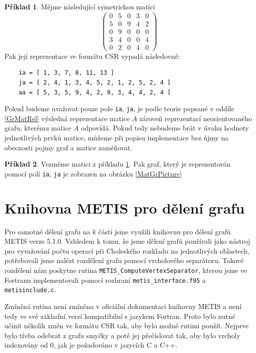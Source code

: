 \documentclass[11pt,american,czech,oneside]{book}
\theoremstyle{plain}
\theoremstyle{definition}
\newtheorem{example}{Příklad}
\begin{document}
\begin{example}
  \label{CSRexample}
  Mějme následující symetrickou matici
  \[
    \begin{pmatrix}
      0 & 5 & 0 & 3 & 0 \\
      5 & 0 & 9 & 4 & 2 \\
      0 & 9 & 0 & 0 & 0 \\
      3 & 4 & 0 & 0 & 4 \\
      0 & 2 & 0 & 4 & 0
    \end{pmatrix}
  \]
  Pak její reprezentace ve formátu CSR vypadá následovně:
  \begin{verbatim}
    ia = [ 1, 3, 7, 8, 11, 13 ]
    ja = [ 2, 4, 1, 3, 4, 5, 2, 1, 2, 5, 2, 4 ]
    aa = [ 5, 3, 5, 9, 4, 2, 9, 3, 4, 4, 2, 4 ]
  \end{verbatim}
\end{example}

Pokud budeme uvažovat pouze pole \texttt{ia}, \texttt{ja}, je podle teorie popsané v oddíle \ref{GrMatRel} výsledná reprezentace matice $A$ zároveň reprezentací neorientovaného grafu, kterému matice $A$ odpovídá. Pokud tedy nebudeme brát v úvahu hodnoty jednotlivých prvků matice, můžeme při popisu implementace bez újmy na obecnosti pojmy graf a matice zaměňovat.

\begin{example}
  Vezměme matici z příkladu \ref{CSRexample}. Pak graf, který je reprezentován pomocí polí \texttt{ia}, \texttt{ja} je zobrazen na obrázku \ref{MatGrPicture}
\end{example}

\section{Knihovna METIS pro dělení grafu}

Pro samotné dělení grafu na $k$ částí jsme využili knihovnu pro dělení grafů METIS \cite{kary:13} verze 5.1.0. Vzhledem k tomu, že jsme dělení grafů používali jako nástroj pro vyvažování počtu operací při Choleského rozkladu na jednotlivých oblastech, potřebovali jsme nalézt rozdělení grafu pomocí vrcholového separátoru. Takové rozdělení nám poskytne rutina \texttt{METIS\_ComputeVertexSeparator}, kterou jsme ve Fortranu implementovali pomocí rozhraní \texttt{metis\_interface.f95} a \texttt{metisinclude.c}.

Zmíněná rutina není zmíněna v oficiální dokumentaci knihovny METIS a není tedy ve své základní verzi kompatibilní s jazykem Fortran. Proto bylo nutné učinit několik změn ve formátu CSR tak, aby bylo možné rutinu použít. Nejprve bylo třeba odebrat z grafu smyčky a poté jej přečíslovat tak, aby bylo vrcholy indexovány od 0, jak je požadováno v jazycích C a C++.
\end{document}
